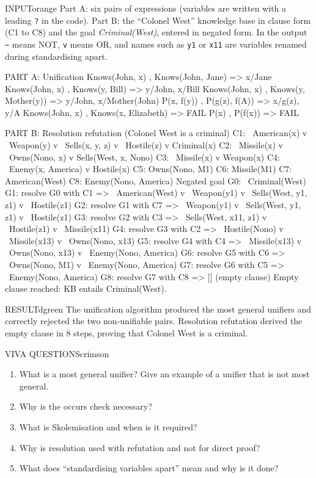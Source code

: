 \documentclass[11pt,a4paper]{article}
\newenvironment{inputbox}{\begin{secbox}{INPUT}{orange}}{\end{secbox}}
\newenvironment{result}{\begin{secbox}{RESULT}{dgreen}}{\end{secbox}}
\newenvironment{viva}{\begin{secbox}{VIVA QUESTIONS}{crimson}}{\end{secbox}}
\begin{document}
\begin{inputbox}
Part A: six pairs of expressions (variables are written with a leading \texttt{?} in the code). Part B: the ``Colonel West'' knowledge base in clause form (C1 to C8) and the goal \textit{Criminal(West)}, entered in negated form. In the output \texttt{\textasciitilde} means NOT, \texttt{v} means OR, and names such as \texttt{y1} or \texttt{x11} are variables renamed during standardising apart.
\end{inputbox}

\begin{outputbox}
PART A: Unification
   Knows(John, x)     , Knows(John, Jane)      => {x/Jane}
   Knows(John, x)     , Knows(y, Bill)         => {y/John, x/Bill}
   Knows(John, x)     , Knows(y, Mother(y))    => {y/John, x/Mother(John)}
   P(x, f(y))         , P(g(z), f(A))          => {x/g(z), y/A}
   Knows(John, x)     , Knows(x, Elizabeth)    => FAIL
   P(x)               , P(f(x))                => FAIL

PART B: Resolution refutation (Colonel West is a criminal)
   C1: ~American(x) v ~Weapon(y) v ~Sells(x, y, z) v ~Hostile(z) v Criminal(x)
   C2: ~Missile(x) v ~Owns(Nono, x) v Sells(West, x, Nono)
   C3: ~Missile(x) v Weapon(x)
   C4: ~Enemy(x, America) v Hostile(x)
   C5: Owns(Nono, M1)
   C6: Missile(M1)
   C7: American(West)
   C8: Enemy(Nono, America)
   Negated goal G0: ~Criminal(West)
   G1: resolve G0 with C1 => ~American(West) v ~Weapon(y1) v ~Sells(West, y1, z1) v ~Hostile(z1)
   G2: resolve G1 with C7 => ~Weapon(y1) v ~Sells(West, y1, z1) v ~Hostile(z1)
   G3: resolve G2 with C3 => ~Sells(West, x11, z1) v ~Hostile(z1) v ~Missile(x11)
   G4: resolve G3 with C2 => ~Hostile(Nono) v ~Missile(x13) v ~Owns(Nono, x13)
   G5: resolve G4 with C4 => ~Missile(x13) v ~Owns(Nono, x13) v ~Enemy(Nono, America)
   G6: resolve G5 with C6 => ~Owns(Nono, M1) v ~Enemy(Nono, America)
   G7: resolve G6 with C5 => ~Enemy(Nono, America)
   G8: resolve G7 with C8 => [] (empty clause)
   Empty clause reached: KB entails Criminal(West).
\end{outputbox}

\begin{result}
The unification algorithm produced the most general unifiers and correctly rejected the two non-unifiable pairs. Resolution refutation derived the empty clause in 8 steps, proving that Colonel West is a criminal.
\end{result}

\begin{viva}
\begin{enumerate}
  \item What is a most general unifier? Give an example of a unifier that is not most general.
  \item Why is the occurs check necessary?
  \item What is Skolemisation and when is it required?
  \item Why is resolution used with refutation and not for direct proof?
  \item What does ``standardising variables apart'' mean and why is it done?
\end{enumerate}
\end{viva}
\end{document}
